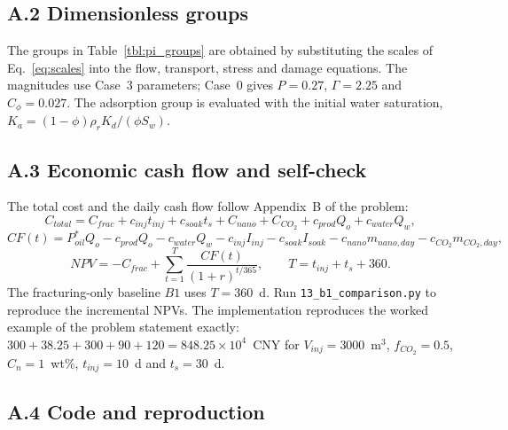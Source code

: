 \documentclass{swmcmthesis}
\begin{document}
\subsection*{A.2 Dimensionless groups}

The groups in Table~\ref{tbl:pi_groups} are obtained by substituting the
scales of Eq.~\eqref{eq:scales} into the flow, transport, stress and damage
equations. The magnitudes use Case~3 parameters; Case~0 gives
$P=0.27$, $\Gamma=2.25$ and $C_\phi=0.027$. The adsorption group is evaluated
with the initial water saturation, $K_a=(1-\phi)\rho_rK_d/(\phi S_w)$.

\subsection*{A.3 Economic cash flow and self-check}

The total cost and the daily cash flow follow Appendix~B of the problem:
\begin{equation}
C_{total}=C_{frac}+c_{inj}t_{inj}+c_{soak}t_s+C_{nano}+C_{CO_2}
+c_{prod}Q_o+c_{water}Q_w,
\end{equation}
\begin{equation}
CF(t)=P_{oil}^*Q_o-c_{prod}Q_o-c_{water}Q_w
-c_{inj}I_{inj}-c_{soak}I_{soak}-c_{nano}m_{nano,day}-c_{CO_2}m_{CO_2,day},
\end{equation}
\begin{equation}
NPV=-C_{frac}+\sum_{t=1}^{T}\frac{CF(t)}{(1+r)^{t/365}},
\qquad T=t_{inj}+t_s+360 .
\end{equation}
The fracturing-only baseline $B1$ uses $T=360$~d.
Run \texttt{13\_b1\_comparison.py} to reproduce the incremental NPVs. The implementation
reproduces the worked example of the problem statement exactly:
$300+38.25+300+90+120=848.25\times10^4$~CNY for $V_{inj}=3000$~m$^3$,
$f_{CO_2}=0.5$, $C_n=1$~wt\%, $t_{inj}=10$~d and $t_s=30$~d.

\subsection*{A.4 Code and reproduction}
\end{document}
